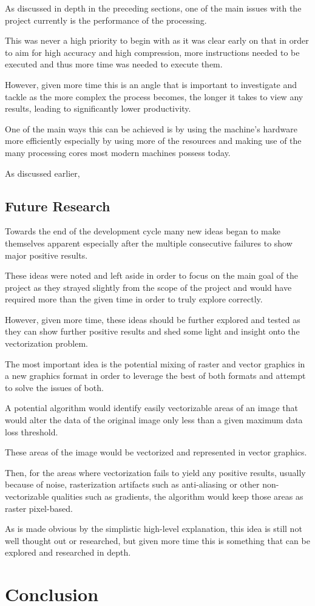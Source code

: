 \documentclass[12pt]{article}
\newcommand{\sentence}{} %
\begin{document}
    \tab
    As discussed in depth in the preceding sections, one of the main issues with the project currently is the
    performance of the processing.
    \sentence
    This was never a high priority to begin with as it was clear early on that in order to aim for high accuracy and
    high compression, more instructions needed to be executed and thus more time was needed to execute them.
    \sentence
    However, given more time this is an angle that is important to investigate and tackle as the more complex the
    process becomes, the longer it takes to view any results, leading to significantly lower productivity.
    \sentence
    One of the main ways this can be achieved is by using the machine's hardware more efficiently especially by using
    more of the resources and making use of the many processing cores most modern machines possess today.
    \sentence
    As discussed earlier, %

    \subsection{Future Research}\label{subsec:future-research}

    \tab
    Towards the end of the development cycle many new ideas began to make themselves apparent especially
    after the multiple consecutive failures to show major positive results.
    \sentence
    These ideas were noted and left aside in order to focus on the main goal of the project as they strayed slightly
    from the scope of the project and would have required more than the given time in order to truly explore correctly.
    \sentence
    However, given more time, these ideas should be further explored and tested as they can show further positive
    results and shed some light and insight onto the vectorization problem.
    \sentence
    The most important idea is the potential mixing of raster and vector graphics in a new graphics format in order
    to leverage the best of both formats and attempt to solve the issues of both.
    \sentence
    A potential algorithm would identify easily vectorizable areas of an image that would alter the data of the
    original image only less than a given maximum data loss threshold.
    \sentence
    These areas of the image would be vectorized and represented in vector graphics.
    \sentence
    Then, for the areas where vectorization fails to yield any positive results, usually because of noise,
    rasterization artifacts such as anti-aliasing or other non-vectorizable qualities such as gradients, the
    algorithm would keep those areas as raster pixel-based.
    \sentence
    As is made obvious by the simplistic high-level explanation, this idea is still not well thought out or
    researched, but given more time this is something that can be explored and researched in depth.

    \pagebreak


    \section{Conclusion}\label{sec:conclusion}


    \pagebreak


    \printbibliography[heading=bibintoc,title={References}]

    \pagebreak
\end{document}
